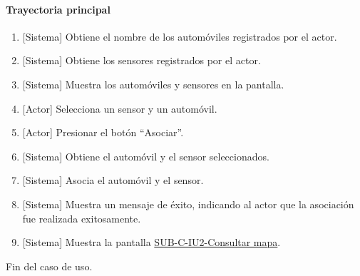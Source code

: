 \paragraph{Trayectoria principal}
	\begin{enumerate}
		\item {[Sistema]} Obtiene el nombre de los automóviles registrados por el actor.
		\item {[Sistema]} Obtiene los sensores registrados por el actor.
		\item {[Sistema]} Muestra los automóviles y sensores en la pantalla.
		\item {[Actor]} Selecciona un sensor y un automóvil.
		\item {[Actor]} Presionar el botón ``Asociar''.
		\item {[Sistema]} Obtiene el automóvil y el sensor seleccionados.
		\item {[Sistema]} Asocia el automóvil y el sensor.
		\item {[Sistema]} Muestra un mensaje de éxito, indicando al actor que la asociación fue realizada exitosamente.
		\item {[Sistema]} Muestra la pantalla \hyperref[fig:sub-c-iu2]{SUB-C-IU2-Consultar mapa}.
	\end{enumerate}
	Fin del caso de uso.

